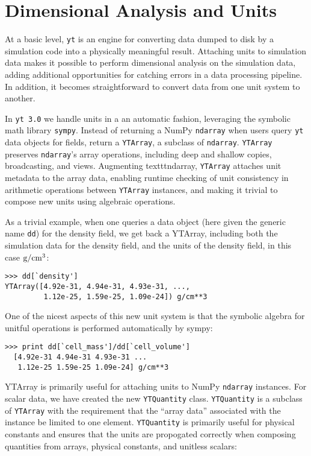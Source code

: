 \section{Dimensional Analysis and Units}

At a basic level, \texttt{yt} is an engine for converting data dumped to disk
by a simulation code into a physically meaningful result.  Attaching units to
simulation data makes it possible to perform dimensional analysis on the
simulation data, adding additional opportunities for catching errors in a data
processing pipeline.  In addition, it becomes straightforward to convert data
from one unit system to another.

In \texttt{yt 3.0} we handle units in a an automatic fashion, leveraging the
symbolic math library \texttt{sympy}. Instead of returning a NumPy
\texttt{ndarray} when users query \texttt{yt} data objects for fields, return a
\texttt{YTArray}, a subclass of \texttt{ndarray}. \texttt{YTArray} preserves
\texttt{ndarray}'s array operations, including deep and shallow copies,
broadcasting, and views.  Augmenting texttt{ndarray}, \texttt{YTArray} attaches
unit metadata to the array data, enabling runtime checking of unit consistency
in arithmetic operations between \texttt{YTArray} instances, and making it
trivial to compose new units using algebraic operations.

As a trivial example, when one queries a data object (here given the generic
name \texttt{dd}) for the density field, we get back a YTArray, including both
the simulation data for the density field, and the units of the density field,
in this case $\rm{g}/\rm{cm}^3$:

\begin{Verbatim}
>>> dd[`density'] 
YTArray([4.92e-31, 4.94e-31, 4.93e-31, ...,
         1.12e-25, 1.59e-25, 1.09e-24]) g/cm**3
\end{Verbatim}

One of the nicest aspects of this new unit system is that the symbolic
algebra for unitful operations is performed automatically by sympy:

\begin{Verbatim}
>>> print dd[`cell_mass']/dd[`cell_volume'] 
  [4.92e-31 4.94e-31 4.93e-31 ... 
   1.12e-25 1.59e-25 1.09e-24] g/cm**3
\end{Verbatim}

YTArray is primarily useful for attaching units to NumPy \texttt{ndarray}
instances. For scalar data, we have created the new \texttt{YTQuantity} class.
\texttt{YTQuantity} is a subclass of \texttt{YTArray} with the requirement that
the ``array data'' associated with the instance be limited to one
element. \texttt{YTQuantity} is primarily useful for physical constants and
ensures that the units are propogated correctly when composing quantities from
arrays, physical constants, and unitless scalars:

